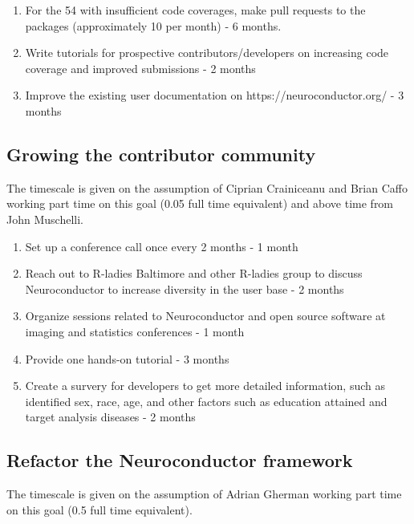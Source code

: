 \documentclass[]{elsarticle} %
\providecommand{\tightlist}{%
  \setlength{\itemsep}{0pt}\setlength{\parskip}{0pt}}
\begin{document}
\begin{enumerate}
\def\labelenumi{\arabic{enumi}.}
\tightlist
\item
  For the 54 with insufficient code coverages, make pull requests to the
  packages (approximately 10 per month) - 6 months.\\
\item
  Write tutorials for prospective contributors/developers on increasing
  code coverage and improved submissions - 2 months
\item
  Improve the existing user documentation on https://neuroconductor.org/
  - 3 months
\end{enumerate}

\subsection{Growing the contributor
community}\label{growing-the-contributor-community-1}

The timescale is given on the assumption of Ciprian Crainiceanu and
Brian Caffo working part time on this goal (0.05 full time equivalent)
and above time from John Muschelli.

\begin{enumerate}
\def\labelenumi{\arabic{enumi}.}
\tightlist
\item
  Set up a conference call once every 2 months - 1 month
\item
  Reach out to R-ladies Baltimore and other R-ladies group to discuss
  Neuroconductor to increase diversity in the user base - 2 months
\item
  Organize sessions related to Neuroconductor and open source software
  at imaging and statistics conferences - 1 month
\item
  Provide one hands-on tutorial - 3 months
\item
  Create a survery for developers to get more detailed information, such
  as identified sex, race, age, and other factors such as education
  attained and target analysis diseases - 2 months
\end{enumerate}

\subsection{Refactor the Neuroconductor
framework}\label{refactor-the-neuroconductor-framework-1}

The timescale is given on the assumption of Adrian Gherman working part
time on this goal (0.5 full time equivalent).
\end{document}
